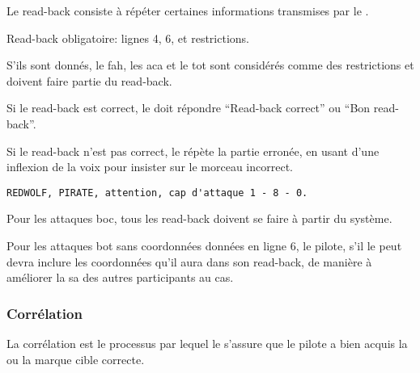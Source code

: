 \begin{e1}
	
	\item Le read-back consiste à répéter certaines informations transmises par le \ja{}.
	
	\item Read-back obligatoire: lignes 4, 6, et restrictions.
	
	\item S'ils sont donnés, le \gls{fah}, les \gls{aca} et le \gls{tot} sont considérés comme des restrictions et doivent faire partie du read-back.
	
	\item Si le read-back est correct, le \ja{} doit répondre ``Read-back correct'' ou ``Bon read-back''.
	
	\begin{minipage}{\linewidth}
		
		\item Si le read-back n'est pas correct, le \ja{} répète la partie erronée, en usant d'une inflexion de la voix pour insister sur le morceau incorrect.
		\begin{lstlisting}[caption=Read-back incorrect, label=9lrbwrong]
REDWOLF, PIRATE, attention, cap d'attaque 1 - 8 - 0.
		\end{lstlisting}
	\end{minipage}
	
	\item Pour les attaques \gls{boc}, tous les read-back doivent se faire à partir du système.
	
	\item Pour les attaques \gls{bot} sans coordonnées données en ligne 6, le pilote, s'il le peut devra inclure les coordonnées qu'il aura dans son read-back, de manière à améliorer la \gls{sa} des autres participants au \gls{cas}.
	
\end{e1}
	
\subsubsection{Corrélation}%

La corrélation est le processus par lequel le \ja{} s'assure que le pilote a bien acquis la ou la marque cible correcte.
	

